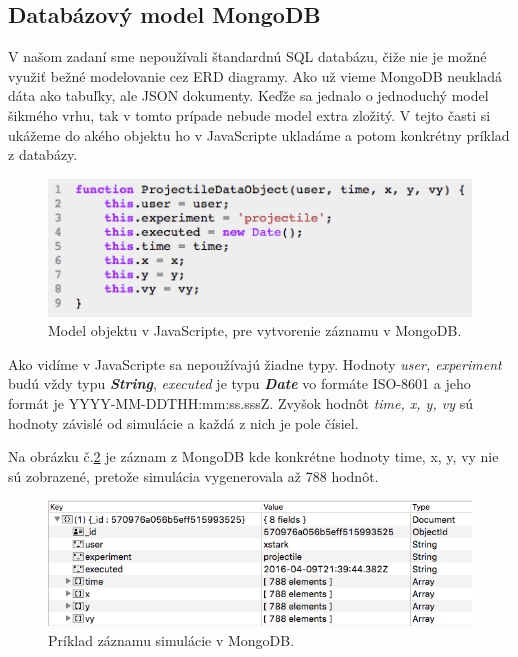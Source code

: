 \subsection{Databázový model MongoDB}
V našom zadaní sme nepoužívali štandardnú SQL databázu, čiže nie je možné využiť bežné modelovanie cez ERD diagramy. Ako už vieme MongoDB neukladá dáta ako tabuľky, ale JSON dokumenty. Keďže sa jednalo o jednoduchý model šikmého vrhu, tak v tomto prípade nebude model extra zložitý. V tejto časti si ukážeme do akého objektu ho v JavaScripte ukladáme a potom konkrétny príklad z databázy.

\begin{figure}[H]
  \centering
  \includegraphics[scale=0.7]{img/code/javascript-projectile-model.png}
  \caption{Model objektu v JavaScripte, pre vytvorenie záznamu v MongoDB.}
  \label{img-js-projectile-model}
\end{figure}

Ako vidíme v JavaScripte sa nepoužívajú žiadne typy. Hodnoty \textit{user, experiment} budú vždy typu \textbf{\textit{String}}, \textit{executed} je typu \textbf{\textit{Date}} vo formáte ISO-8601 a jeho formát je YYYY-MM-DDTHH:mm:ss.sssZ. Zvyšok hodnôt \textit{time, x, y, vy} sú hodnoty závislé od simulácie a každá z nich je pole čísiel.

Na obrázku č.\ref{img-mongo-record} je záznam z MongoDB kde konkrétne hodnoty time, x, y, vy nie sú zobrazené, pretože simulácia vygenerovala až 788 hodnôt.

\begin{figure}[H]
  \centering
  \includegraphics[scale=0.7]{img/code/mongodb-record.png}
  \caption{Príklad záznamu simulácie v MongoDB.}
  \label{img-mongo-record}
\end{figure}

